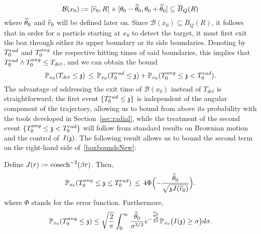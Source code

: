 \begin{equation}\label{eqn:up:box}
\mathcal{B}(x_0):=[\hatr,R]\times[\theta_0-\hatt,\theta_0+\hatt]\subseteq \overline{B}_Q(R)
\end{equation}
where $\hatt$ and $\hatr$ will be defined later on. %
Since $\mathcal{B}(x_0)\subseteq\overline{B}_Q(R)$, it follows that in order for a particle starting at $x_0$ to detect the target, it must first exit the box through either its upper boundary or its side boundaries. Denoting by $\trad$ and $\tang$ the respective hitting times of said boundaries, this implies that $\trad\wedge \tang\leq T_{det}$, and we can obtain the bound
\begin{equation}\label{boxboundsNew}\PP_{x_0}(T_{det}\leq \ss)\,\leq\,\PP_{x_0}(\trad\leq \ss)+\PP_{x_0}(\tang\leq \ss<\trad).\end{equation}
The advantage of addressing the exit time of $\mathcal{B}(x_0)$ instead of $T_{det}$ is straightforward; the first event $\{T_0^{rad}\le \ss\}$ is independent of the angular component of the trajectory, allowing us to bound from above its probability with the tools developed in Section~\ref{sec:radial}, while the treatment of the second event $\{T_0^{ang}\le \ss<T_0^{rad}\}$ will follow from standard results on Brownian motion and the control of~$\II{\ss}$. The following result allows us to bound the second term on the right-hand side of~\eqref{boxboundsNew}:
\begin{proposition}\label{prop:mainuppermixed}
Define $J(r):=\cosech^{-2}(\beta r)$. Then,
\[\PP_{x_0}(\tang\leq \ss\leq\trad)\,\leq\,4\Phi\Big({-}\frac{\hatt}{\sqrt{\ss\JJ(\hatr)}}\Big).\]
where $\Phi$ stands for the error function. Furthermore, %
\[\PP_{x_0}(\tang\leq \ss)\leq \sqrt{\frac{2}{\pi}}\int_{0}^{\infty}\frac{\hatt}{\sigma^{3/2}}e^{-\frac{\hatt^2}{2\sigma}}\PP_{x_0}\big(\II{\ss}\geq\sigma\big)d\sigma.
\]
\end{proposition}
